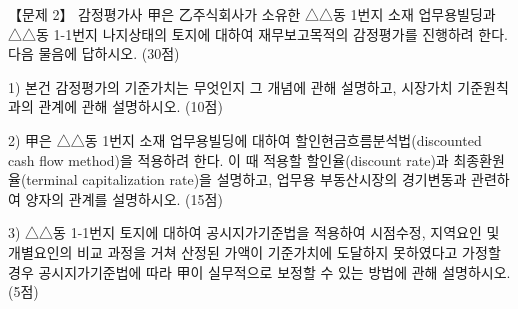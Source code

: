 \begin{longquestion}{【문제 2】}
감정평가사 甲은 乙주식회사가 소유한 △△동 1번지 소재 업무용빌딩과 △△동 1-1번지 나지상태의 토지에 대하여 재무보고목적의 감정평가를 진행하려 한다. 다음 물음에 답하시오. (30점) \par
1) 본건 감정평가의 기준가치는 무엇인지 그 개념에 관해 설명하고, 시장가치 기준원칙과의 관계에 관해 설명하시오. (10점) \par
2) 甲은 △△동 1번지 소재 업무용빌딩에 대하여 할인현금흐름분석법(discounted cash flow method)을 적용하려 한다. 이 때 적용할 할인율(discount rate)과 최종환원율(terminal capitalization rate)을 설명하고, 업무용 부동산시장의 경기변동과 관련하여 양자의 관계를 설명하시오. (15점) \par
3) △△동 1-1번지 토지에 대하여 공시지가기준법을 적용하여 시점수정, 지역요인 및 개별요인의 비교 과정을 거쳐 산정된 가액이 기준가치에 도달하지 못하였다고 가정할 경우 공시지가기준법에 따라 甲이 실무적으로 보정할 수 있는 방법에 관해 설명하시오. (5점) \par
\end{longquestion}
